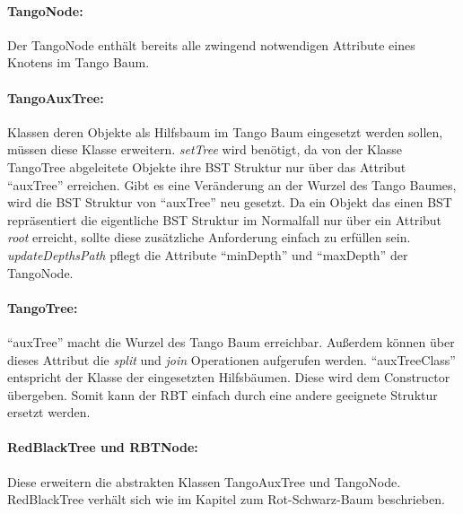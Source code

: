 \documentclass[a4paper,12pt]{article}
\begin{document}
\paragraph{TangoNode:}
Der TangoNode enthält bereits alle zwingend notwendigen Attribute eines Knotens im Tango Baum. 

\paragraph{TangoAuxTree:}
Klassen deren Objekte als Hilfsbaum im Tango Baum eingesetzt werden sollen, müssen diese Klasse erweitern. \textit{setTree} wird benötigt, da von der Klasse TangoTree abgeleitete Objekte ihre BST Struktur nur über das Attribut \enquote{auxTree} erreichen. Gibt es eine Veränderung an der Wurzel des Tango Baumes, wird die BST Struktur von \enquote{auxTree} neu gesetzt. Da ein Objekt das einen BST repräsentiert die eigentliche BST Struktur im Normalfall nur über ein Attribut \textit{root} erreicht, sollte diese zusätzliche Anforderung einfach zu erfüllen sein. \textit{updateDepthsPath} pflegt die Attribute \enquote{minDepth} und \enquote{maxDepth} der TangoNode.

\paragraph{TangoTree:}
\enquote{auxTree} macht die Wurzel des Tango Baum erreichbar. Außerdem können über dieses Attribut die \textit{split} und \textit{join} Operationen aufgerufen werden. \enquote{auxTreeClass} entspricht der Klasse der eingesetzten Hilfsbäumen. Diese wird dem Constructor übergeben. Somit kann der RBT einfach durch eine andere geeignete Struktur ersetzt werden.

\paragraph{RedBlackTree und RBTNode:}
Diese erweitern die abstrakten Klassen TangoAuxTree und TangoNode. RedBlackTree verhält sich wie im Kapitel zum Rot-Schwarz-Baum  beschrieben. 
\end{document}
